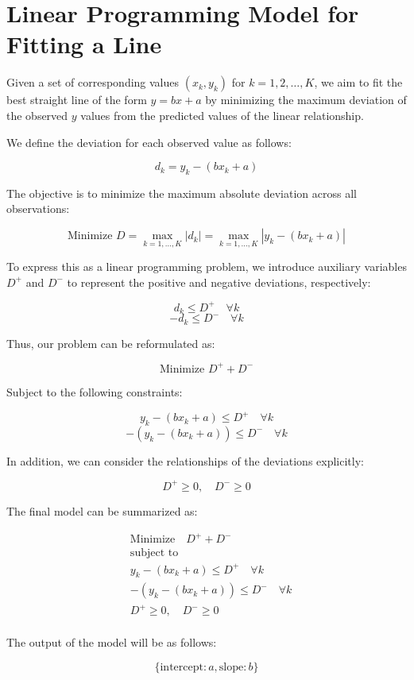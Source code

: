 \documentclass{article}
\begin{document}
\section*{Linear Programming Model for Fitting a Line}

Given a set of corresponding values \( (x_k, y_k) \) for \( k = 1, 2, \ldots, K \), we aim to fit the best straight line of the form \( y = bx + a \) by minimizing the maximum deviation of the observed \( y \) values from the predicted values of the linear relationship.

We define the deviation for each observed value as follows:

\[
d_k = y_k - (bx_k + a)
\]

The objective is to minimize the maximum absolute deviation across all observations:

\[
\text{Minimize } D = \max_{k=1,\ldots,K} |d_k| = \max_{k=1,\ldots,K} |y_k - (bx_k + a)|
\]

To express this as a linear programming problem, we introduce auxiliary variables \( D^+ \) and \( D^- \) to represent the positive and negative deviations, respectively:

\[
d_k \leq D^+ \quad \forall k
\]
\[
-d_k \leq D^- \quad \forall k
\]

Thus, our problem can be reformulated as:

\[
\text{Minimize } D^+ + D^-
\]

Subject to the following constraints:

\[
y_k - (bx_k + a) \leq D^+ \quad \forall k
\]
\[
-(y_k - (bx_k + a)) \leq D^- \quad \forall k
\]

In addition, we can consider the relationships of the deviations explicitly:

\[
D^+ \geq 0, \quad D^- \geq 0
\]

The final model can be summarized as:

\[
\begin{aligned}
& \text{Minimize}\quad D^+ + D^- \\
& \text{subject to} \\
& y_k - (bx_k + a) \leq D^+ \quad \forall k \\
& -(y_k - (bx_k + a)) \leq D^- \quad \forall k \\
& D^+ \geq 0, \quad D^- \geq 0 \\
\end{aligned}
\]

The output of the model will be as follows:

\[
\{ \text{intercept}: a, \text{slope}: b \}
\]
\end{document}
